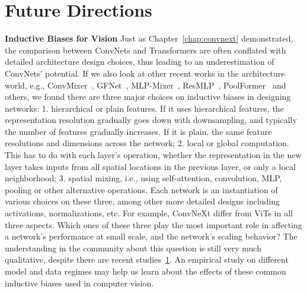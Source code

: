 \documentclass{ucbthesis}
\renewcommand{\paragraph}[1]{\vspace{1.25mm}\noindent\textbf{#1}}
\begin{document}
\section{Future Directions}
\paragraph{Inductive Biases for Vision}
Just as Chapter~\ref{chap:convnext} demonstrated, the comparison between ConvNets and Transformers are often conflated with detailed architecture design choices, thus leading to an underestimation of ConvNets' potential. If we also look at other recent works in the architecture world, e.g., ConvMixer~\cite{convmixer}, GFNet~\cite{rao2021global}, MLP-Mixer~\cite{}, ResMLP~\cite{touvron2021resmlp}, PoolFormer~\cite{yu2021metaformer} and others, we found there are three major choices on inductive biases in designing networks: 1. hierarchical or plain features.  If it uses hierarchical features, the representation resolution gradually goes down with downsampling, and typically the number of features gradually increases. If it is plain, the same feature resolutions and dimensions across the network; 2. local or global computation. This has to do with each layer's operation, whether the representation in the new layer takes inputs from all spatial locations in the previous layer, or only a local neighborhood; 3. spatial mixing, i.e., using self-attention, convolution, MLP, pooling or other alternative operations. Each network is an instantiation of various choices on these three, among other more detailed designs including activations, normalizations, etc. For example, ConvNeXt differ from ViTs in all three aspects. Which ones of these three play the most important role in affecting a network's performance at small scale, and the network's scaling behavior? The understanding in the community about this question is still very much qualitative, despite there are recent studies~\ref{}. An empirical study on different model and data regimes may help us learn about the effects of these common inductive biases used in computer vision.

\end{document}
